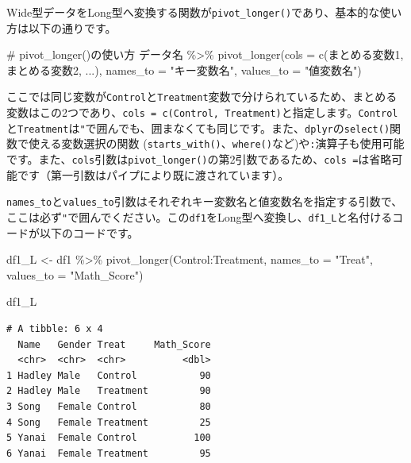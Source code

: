 \documentclass[
  a4paper,
  pandoc,
  ja=standard,
  jafont=haranoaji]{bxjsbook}
\newenvironment{Shaded}{\begin{snugshade}}{\end{snugshade}}
\newcommand{\AttributeTok}[1]{\textcolor[rgb]{0.00,0.48,0.65}{#1}}
\newcommand{\CommentTok}[1]{\textcolor[rgb]{0.37,0.37,0.37}{#1}}
\newcommand{\FunctionTok}[1]{\textcolor[rgb]{0.28,0.35,0.67}{#1}}
\newcommand{\NormalTok}[1]{\textcolor[rgb]{0.00,0.48,0.65}{#1}}
\newcommand{\OtherTok}[1]{\textcolor[rgb]{0.00,0.48,0.65}{#1}}
\newcommand{\SpecialCharTok}[1]{\textcolor[rgb]{0.37,0.37,0.37}{#1}}
\newcommand{\StringTok}[1]{\textcolor[rgb]{0.13,0.47,0.30}{#1}}
\begin{document}
Wide型データをLong型へ変換する関数が\texttt{pivot\_longer()}であり、基本的な使い方は以下の通りです。

\begin{Shaded}
\begin{Highlighting}[numbers=left,,]
\CommentTok{\# pivot\_longer()の使い方}
\NormalTok{データ名 }\SpecialCharTok{\%\textgreater{}\%}
  \FunctionTok{pivot\_longer}\NormalTok{(}\AttributeTok{cols      =} \FunctionTok{c}\NormalTok{(まとめる変数1, まとめる変数2, ...),}
               \AttributeTok{names\_to  =} \StringTok{"キー変数名"}\NormalTok{,}
               \AttributeTok{values\_to =} \StringTok{"値変数名"}\NormalTok{)}
\end{Highlighting}
\end{Shaded}

ここでは同じ変数が\texttt{Control}と\texttt{Treatment}変数で分けられているため、まとめる変数はこの2つであり、\texttt{cols\ =\ c(Control,\ Treatment)}と指定します。\texttt{Control}と\texttt{Treatment}は\texttt{"}で囲んでも、囲まなくても同じです。また、\texttt{dplyr}の\texttt{select()}関数で使える変数選択の関数
(\texttt{starts\_with()}、\texttt{where()}など)や\texttt{:}演算子も使用可能です。また、\texttt{cols}引数は\texttt{pivot\_longer()}の第2引数であるため、\texttt{cols\ =}は省略可能です（第一引数はパイプにより既に渡されています）。

\texttt{names\_to}と\texttt{values\_to}引数はそれぞれキー変数名と値変数名を指定する引数で、ここは必ず\texttt{"}で囲んでください。この\texttt{df1}をLong型へ変換し、\texttt{df1\_L}と名付けるコードが以下のコードです。

\begin{Shaded}
\begin{Highlighting}[numbers=left,,]
\NormalTok{df1\_L }\OtherTok{\textless{}{-}}\NormalTok{ df1 }\SpecialCharTok{\%\textgreater{}\%}
  \FunctionTok{pivot\_longer}\NormalTok{(Control}\SpecialCharTok{:}\NormalTok{Treatment,}
               \AttributeTok{names\_to  =} \StringTok{"Treat"}\NormalTok{,}
               \AttributeTok{values\_to =} \StringTok{"Math\_Score"}\NormalTok{)}

\NormalTok{df1\_L}
\end{Highlighting}
\end{Shaded}

\begin{verbatim}
# A tibble: 6 x 4
  Name   Gender Treat     Math_Score
  <chr>  <chr>  <chr>          <dbl>
1 Hadley Male   Control           90
2 Hadley Male   Treatment         90
3 Song   Female Control           80
4 Song   Female Treatment         25
5 Yanai  Female Control          100
6 Yanai  Female Treatment         95
\end{verbatim}
\end{document}
